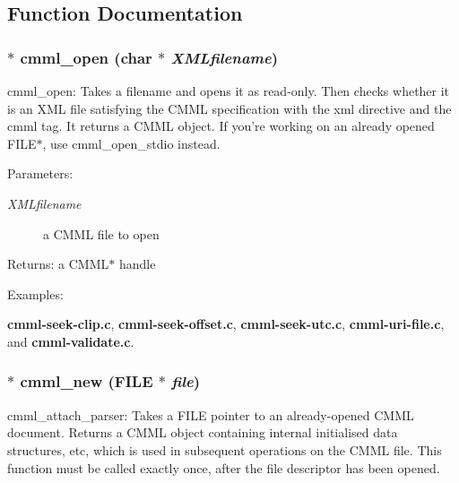 \subsection{Function Documentation}
\subsubsection{$\ast$ cmml\_\-open (char $\ast$ {\em XMLfilename})}\label{cmml_8h_a37}


cmml\_\-open: Takes a filename and opens it as read-only. Then checks whether it is an XML file satisfying the CMML specification with the xml directive and the cmml tag. It returns a CMML object. If you're working on an already opened FILE$\ast$, use cmml\_\-open\_\-stdio instead.

\begin{Desc}
\item[Parameters:]
\begin{description}
\item[{\em XMLfilename}]a CMML file to open\end{description}
\end{Desc}
\begin{Desc}
\item[Returns:]a CMML$\ast$ handle \end{Desc}
\begin{Desc}
\item[Examples: ]\par
{\bf cmml-seek-clip.c}, {\bf cmml-seek-offset.c}, {\bf cmml-seek-utc.c}, {\bf cmml-uri-file.c}, and {\bf cmml-validate.c}.\end{Desc}
\subsubsection{$\ast$ cmml\_\-new (FILE $\ast$ {\em file})}\label{cmml_8h_a38}


cmml\_\-attach\_\-parser: Takes a FILE pointer to an already-opened CMML document. Returns a CMML object containing internal initialised data structures, etc, which is used in subsequent operations on the CMML file. This function must be called exactly once, after the file descriptor has been opened.

